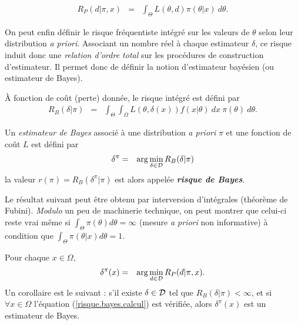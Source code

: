 \begin{definition}
\begin{eqnarray*}
{R_P(d|\pi,x)} & = & {\int_{\Theta} L(\theta,d) \pi(\theta|x) \ d\theta}.
\end{eqnarray*}
\end{definition}

On peut enfin définir le  risque fréquentiste intégré sur les valeurs de $\theta$ selon leur distribution {\it a priori}. Associant un nombre réel à chaque estimateur $\delta$, ce risque induit donc une  \emph{relation d'ordre total}
 sur les procédures de construction d'estimateur. Il permet donc de définir la notion d'estimateur bayésien (ou estimateur de Bayes). 


\begin{definition}
\`A fonction de coût (perte) donnée, le risque intégré est défini par
\begin{eqnarray*}
{R_B(\delta|\pi)} & = & {\int_{\Theta} \int_{\Omega} L(\theta,\delta(x)) f(x|\theta) \ dx \ \pi(\theta) \ d\theta}.
\end{eqnarray*}
\end{definition}

\begin{definition}
Un  \emph{estimateur de Bayes} associé à une distribution {\it a priori} $\pi$ et une fonction de co\^ut $L$ est défini par 
\begin{eqnarray*}
\delta^{\pi} & = & \arg\min\limits_{\delta\in{\cal{D}}} R_B(\delta|\pi)
\end{eqnarray*}
la valeur $r(\pi) = R_B(\delta^{\pi}|\pi)$ est alors appelée  { \emph{\bf risque de Bayes}}.
\end{definition}

\noindent Le résultat suivant peut être obtenu par interversion d'intégrales (théorème de Fubini). {\it Modulo} un peu de machinerie technique, on peut montrer que celui-ci reste vrai m\^eme si $\int_{\Theta}\pi(\theta) d \theta=\infty$ {(mesure {\it a priori} non informative)} à condition que
$\int_{\Theta}\pi(\theta|x) d \theta = 1$. 

\begin{theorem}
Pour chaque $x\in\Omega$,
\begin{eqnarray}
\delta^{\pi}(x) & = & \arg\min\limits_{d\in{\cal{D}}}  R_P(d|\pi,x). \label{risque.bayes.calcul}
\end{eqnarray}
Un corollaire est le suivant : s'il existe $\delta\in{\cal{D}}$ tel que $R_B(\delta|\pi)<\infty$, et si $\forall x\in \Omega$ l'équation (\ref{risque.bayes.calcul}) est vérifiée, alors $\delta^{\pi}(x)$ est un estimateur de Bayes.
\end{theorem}

